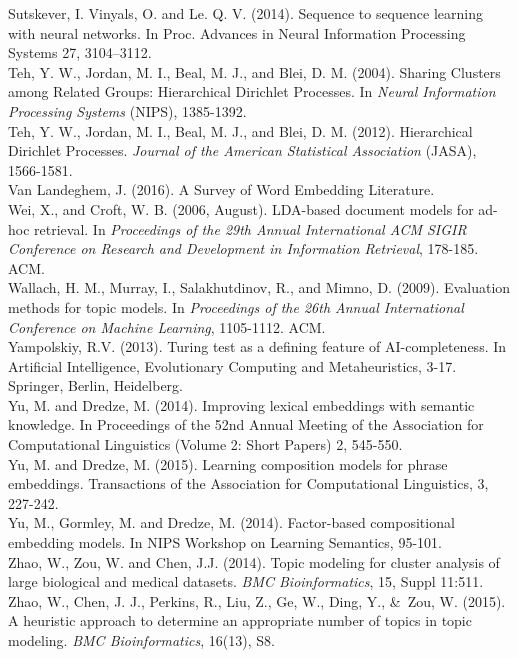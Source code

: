\documentclass[11pt]{article}
\begin{document}
Sutskever, I. Vinyals, O. and Le. Q. V. (2014). Sequence to sequence learning with neural networks. In Proc. Advances in Neural Information Processing Systems 27, 3104–3112.\\
\newline
Teh, Y. W., Jordan, M. I., Beal, M. J., and Blei, D. M. (2004). Sharing Clusters among Related Groups: Hierarchical Dirichlet Processes. In \emph{Neural Information Processing Systems} (NIPS), 1385-1392.\\
\newline
Teh, Y. W., Jordan, M. I., Beal, M. J., and Blei, D. M. (2012). Hierarchical Dirichlet Processes. \emph{Journal of the American Statistical Association} (JASA), 1566-1581.\\
\newline
Van Landeghem, J. (2016). A Survey of Word Embedding Literature.\\
\newline
Wei, X., and Croft, W. B. (2006, August). LDA-based document models for ad-hoc retrieval. In \emph{Proceedings of the 29th Annual International ACM SIGIR Conference on Research and Development in Information Retrieval}, 178-185. ACM.\\
\newline
Wallach, H. M., Murray, I., Salakhutdinov, R., and Mimno, D. (2009). Evaluation methods for topic models. In \emph{Proceedings of the 26th Annual International Conference on Machine Learning}, 1105-1112. ACM.\\
\newline
Yampolskiy, R.V. (2013). Turing test as a defining feature of AI-completeness. In Artificial Intelligence, Evolutionary Computing and Metaheuristics, 3-17. Springer, Berlin, Heidelberg.\\
\newline
Yu, M. and Dredze, M. (2014). Improving lexical embeddings with semantic knowledge. In Proceedings of the 52nd Annual Meeting of the Association for Computational Linguistics (Volume 2: Short Papers) 2, 545-550.\\
\newline
Yu, M. and Dredze, M. (2015). Learning composition models for phrase embeddings. Transactions of the Association for Computational Linguistics, 3, 227-242.\\
\newline
Yu, M., Gormley, M. and Dredze, M. (2014). Factor-based compositional embedding models. In NIPS Workshop on Learning Semantics, 95-101.\\
\newline
Zhao, W., Zou, W. and Chen, J.J. (2014). Topic modeling for cluster analysis of large biological and medical datasets. \emph{BMC Bioinformatics}, 15, Suppl 11:511.\\
\newline
Zhao, W., Chen, J. J., Perkins, R., Liu, Z., Ge, W., Ding, Y., \&\ Zou, W. (2015). A heuristic approach to determine an appropriate number of topics in topic modeling. \emph{BMC Bioinformatics}, 16(13), S8.\\
\newline
\end{document}
